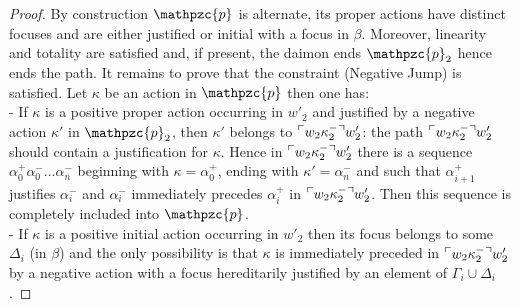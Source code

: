 \documentclass{LMCS}
\newcommand{\design}[1]{{\mathfrak{#1}}}
\newcommand{\pathLL}[1]{\mathpzc{#1}}\newcommand{\strategy}[1]{\pathLL{#1}}\newcommand{\view}[1]{\raisebox{.3ex}{$\ulcorner$}{#1}\raisebox{.3ex}{$\urcorner$}}\newcommand{\fullview}[1]{\raisebox{.3ex}{$\ulcorner\mkern-6mu\ulcorner\mkern-2mu$}{#1}\raisebox{.3ex}{$\mkern-2mu\urcorner\mkern-6mu\urcorner$}}\newcommand{\views}[1]{\view{#1}}\newcommand{\fullviews}[1]{\fullview{#1}}\newcommand{\shuffle}[1]{\llcorner\design{#1}\lrcorner}\newcommand{\PoD}[1]{{\mathcal{P}}_{#1}}\newcommand{\norm}[1]{\llbracket\design{#1}\rrbracket}
\begin{document}
\begin{proof}
By construction  $\pathLL{p}$ is alternate, its proper actions have distinct focuses and are  either justified or   initial with a focus in $\beta$. Moreover, linearity and totality are satisfied and, if present, the daimon ends $\pathLL{p}_2$ hence ends the path. It remains to prove that the constraint (Negative Jump) is satisfied. Let $\kappa$ be an action in $\pathLL{p}$ then one has:\\
- If  $\kappa$ is a positive proper action occurring in $w'_2$ and  justified by a negative
action $\kappa'$ in $\pathLL{p}_2$, then $\kappa'$ belongs to $\view{w_2\kappa_2^-}w'_2$: the path $\view{w_2\kappa_2^-}w'_2$ should contain a justification for $\kappa$. Hence in $\view{w_2\kappa_2^-}w'_2$ there is a sequence
$\alpha_0^+\alpha^-_0\dots\alpha^-_n$  beginning with
$\kappa=\alpha_0^+$, ending with $\kappa'=\alpha_n^-$ and such that
$\alpha_{i+1}^+$ justifies $\alpha_i^-$ and
$\alpha^-_i$ immediately precedes $\alpha^+_i$ in $\view{w_2\kappa_2^-}w'_2$. Then  this sequence is completely included  into $\pathLL{p}$. \\
- If  $\kappa$ is a positive initial action occurring in $w'_2$ then its focus belongs to some $\Delta_i$ (in $\beta$) and  the only possibility is that  $\kappa$ is immediately preceded in
$\view{w_2\kappa_2^-}w'_2$ by a negative action with a focus hereditarily justified by an element
of $\Gamma_i\cup\Delta_i$.
 \end{proof}
\end{document}
